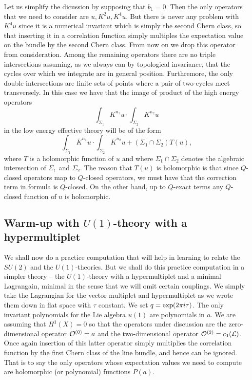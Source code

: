 \documentclass[10pt]{article}
\def\ov{\overline}
\begin{document}
Let us simplify the dicussion by supposing that $b_1=0$. Then the only
operators that we need to consider are $u,K^2u,K^4u$.  But there is
never any problem with $K^4u$ since it is a numerical invariant which
is simply the second Chern
class, so that inserting it in a correlation function simply multiples
the expectation value on the bundle by the  second Chern class.
{}From now on we drop this operator from consideration.
Among the remaining operators there are no triple intersections
assuming, as we always can by topological invariance, that the cycles
over which we integrate are in general position.  Furthremore, the only
double intersections are finite sets of points where a pair of
two-cycles meet transversely.  In this case we have that the image of
product of the high energy operators
$$\int_{\Sigma_1}K^{n_1}u\cdot \int_{\Sigma_2}K^{n_2}u$$ 
in the low energy effective theory will be of the form
$$\int_{\Sigma_1}\ov K^{n_1}u\cdot
\int_{\Sigma_2}\ov K^{n_2}u+(\Sigma_1\cap\Sigma_2)T(u),$$ 
where $T$ is a holomorphic  function of $u$ and where
$\Sigma_1\cap\Sigma_2$ denotes the algebraic intersection of
$\Sigma_1$ and $\Sigma_2$.
The reason that $T(u)$ is holomorphic is that since $Q$-closed
operators map to $Q$-closed operators, we must have that the
correction term in formula is $Q$-closed. On the other hand, up to
$Q$-exact terms any $Q$-closed function of $u$ is holomorphic.

\subsection{Warm-up with $U(1)$-theory with a hypermultiplet}

We shall now do a practice computation that will help in learning to
relate the $SU(2)$ and the $U(1)$-theories. 
But we  shall do this practice computation in
a simpler theory -- the $U(1)$-theory with a hypermultiplet and a
minimal Lagrangain, minimal in the sense that we will  omit certain
couplings. 
We simply
take the Lagrangian for the vector multiplet and hypermultiplet as we
wrote them down in flat space with $\tau$ constant. We set $q={\rm
exp}(2\pi i\tau)$. 
The only invariant polynomials for the Lie algebra $u(1)$ are
polynomials in $a$.
 We are 
assuming that $H^1(X)=0$ so that the  operators  under discussion are 
the zero-dimensional operator ${\cal O}^{(0)}=a$ and the
two-dimensional operator ${\cal
O}^{(2)}=c_1({\cal L})$. 
Once again insertion of this latter operator simply multiplies the
correlation function by the first Chern class of the line bundle, and
hence can be ignored.
That is to say the only operators whose expectation values we
need to compute are holomorphic (or polynomial) functions $P(a)$. 
\end{document}

